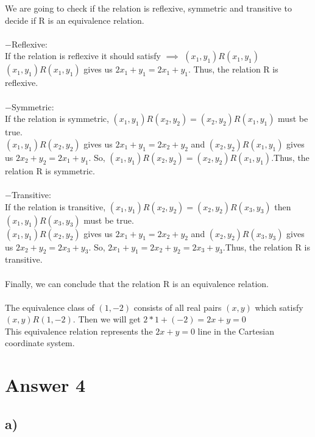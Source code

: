 \documentclass[12pt]{article}
\begin{document}
We are going to check if the relation is reflexive, symmetric and transitive to decide if R is an equivalence relation.\\
\\
$-$Reflexive:\\
If the relation is reflexive it should satisfy $\implies$ $(x_1,y_1)R(x_1,y_1)$\\
$(x_1,y_1)R(x_1,y_1)$ gives us $2x_1 + y_1 = 2x_1 +y_1$. Thus, the relation R is reflexive.\\
\\
$-$Symmetric:\\
If the relation is symmetric, $(x_1,y_1)R(x_2,y_2) = (x_2,y_2)R(x_1,y_1)$ must be true.\\
$(x_1,y_1)R(x_2,y_2)$ gives us $2x_1 + y_1 = 2x_2 +y_2$ and $(x_2,y_2)R(x_1,y_1)$ gives us $2x_2 + y_2 = 2x_1 +y_1$. So, $(x_1,y_1)R(x_2,y_2) = (x_2,y_2)R(x_1,y_1).$Thus, the relation R is symmetric.\\
\\
$-$Transitive:\\
If the relation is transitive, $(x_1,y_1)R(x_2,y_2) = (x_2,y_2)R(x_3,y_3)$ then $(x_1,y_1)R(x_3,y_3)$ must be true.\\
$(x_1,y_1)R(x_2,y_2)$ gives us $2x_1 + y_1 = 2x_2 +y_2$ and $(x_2,y_2)R(x_3,y_3)$ gives us $2x_2 + y_2 = 2x_3 +y_3$. So, $2x_1 + y_1 = 2x_2 +y_2 = 2x_3 +y_3$.Thus, the relation R is transitive.\\
\\
Finally, we can conclude that the relation R is an equivalence relation.\\
\\
The equivalence class of $(1,-2)$ consists of all real pairs $(x,y)$ which satisfy $(x,y)R(1,-2)$. Then we will get $2*1 + (-2) = 2x + y = 0$\\
This equivalence relation represents the $2x + y = 0$ line in the Cartesian coordinate system.\\

\section*{Answer 4}
\subsection*{a) }
\end{document}
